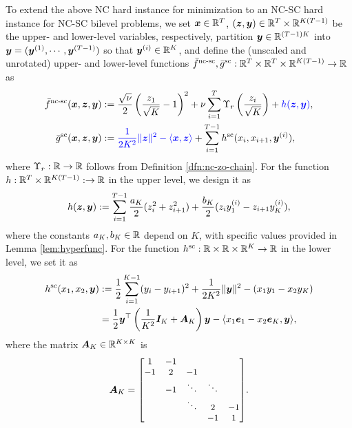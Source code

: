 \documentclass{article}
\begin{document}
To extend the above NC hard instance for minimization to an NC-SC hard instance for NC-SC bilevel problems, we set ${\bm{x}} \in {\mathbb{R}}^T$, $({\bm{z}},{\bm{y}}) \in  {\mathbb{R}}^T \times {\mathbb{R}}^{K(T-1)} $ be the upper- and lower-level variables, respectively, partition ${\bm{y}} \in {\mathbb{R}}^{(T-1)K}$ into ${\bm{y}} = ({\bm{y}}^{(1)},\cdots, {\bm{y}}^{(T-1)})$ so that ${\bm{y}}^{(i)} \in {\mathbb{R}}^K$, 
and define the (unscaled and unrotated) upper- and lower-level functions $\bar f^{\text{nc-sc}}, \bar g^{\rm sc}: {\mathbb{R}}^{T} \times {\mathbb{R}}^{T} \times {\mathbb{R}}^{K(T-1)} \rightarrow {\mathbb{R}} $ as
\begin{align} \label{eq:our-f}
\begin{split}
     \bar f^{\text{nc-sc}}({\bm{x}},{\bm{z}},{\bm{y}})&:= \frac{\sqrt{\nu}}{2} \left( \frac{z_1}{\sqrt{K}} - 1 \right)^2
     + \nu \sum_{i=1}^{T} \Upsilon_r \left( \frac{z_i}{\sqrt{K}} \right) + {\color{blue}h({\bm{z}},{\bm{y}})}, \\
\bar g^{\rm sc}({\bm{x}},{\bm{z}},{\bm{y}}) &:= 
{\color{blue} \frac{1}{2K^2} \Vert {\bm{z}} \Vert^2 - \langle {\bm{x}}, {\bm{z}} \rangle} +  \sum_{i=1}^{T-1} h^{\rm sc}(x_{i}, x_{i+1}, {\bm{y}}^{(i)}),
\end{split}
\end{align}
where $\Upsilon_r: {\mathbb{R}} \rightarrow {\mathbb{R}}$  follows from Definition \ref{dfn:nc-zo-chain}. For the function $h: {\mathbb{R}}^{T} \times {\mathbb{R}}^{K(T-1)}: \rightarrow {\mathbb{R}}$ in the upper level, we design it as
\begin{align} \label{eq:our-hard-h}
    h({\bm{z}},{\bm{y}}) := \sum_{i=1}^{T-1} \frac{a_K}{2} (z_i^2+ z_{i+1}^2) +  \frac{b_K}{2} (z_i y_1^{(i)} - z_{i+1} y_K^{(i)}),
\end{align}
where the constants $a_K, b_K \in {\mathbb{R}}$ depend on $K$, with specific values provided in Lemma \ref{lem:hyperfunc}.
For the function $h^{\rm sc}: {\mathbb{R}} \times {\mathbb{R}} \times {\mathbb{R}}^K \rightarrow {\mathbb{R}}$ in the lower level, we set it as 
\begin{align} \label{eq:sc-sub-chain}
\begin{split}
h^{\rm sc}(x_1,x_2,{\bm{y}}) &:= \frac{1}{2} \sum_{i=1}^{K-1} (y_i - y_{i+1})^2 + \frac{1}{2K^2} \Vert {\bm{y}} \Vert^2 - \left( x_1 y_1 - x_2 y_K \right) \\
     &=\frac{1}{2} {\bm{y}}^\top \left( \frac{1}{K^2} {\bm{I}}_K + {\bm{A}}_K \right)
 {\bm{y}} -  \langle x_1 {\bm{e}}_1 - x_2 {\bm{e}}_K, {\bm{y}} \rangle,
\end{split}
\end{align}
where the matrix ${\bm{A}}_K \in {\mathbb{R}}^{K \times K} $ is
\begin{align} \label{eq:finite-A}
   {\bm{A}}_K
    =
    {\small
    \begin{bmatrix}
        1 & -1 \\
        -1 & 2 & -1 \\
        & -1 & \ddots & \ddots  \\
        & & \ddots & 2 & -1 \\
        & &  & -1 & 1\\
    \end{bmatrix}}.
\end{align}
\end{document}
